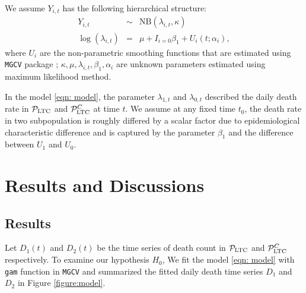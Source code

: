 \documentclass[12pt]{article}
\begin{document}
We assume $Y_{i,t}$ has the following hierarchical structure:
\begin{equation}
    \begin{array}{rcl} \label{eqn: model}
        Y_{i,t} &\sim& \mathrm{NB}(\lambda_{i,t}, \kappa)
        \\
        \log(\lambda_{i,t}) &=& \mu + I_{i=0} \beta_1 + U_i(t;\alpha_i),        
    \end{array}
\end{equation}
where $U_i$ are the non-parametric smoothing functions that are estimated using \verb|MGCV| package \cite{wood2015package};
$\kappa, \mu, \lambda_{i,t}, \beta_1, \alpha_i$ are unknown parameters estimated using maximum likelihood method.

In the model \eqref{eqn: model}, the parameter $\lambda_{1,t}$ and $\lambda_{0,t}$ described the daily death rate in $\mathcal{P}_{\mathrm{LTC}}$ and $\mathcal P_{\mathrm{LTC}}^C$ at time $t$. 
We assume at any fixed time $t_0$, the death rate in two subpopulation is roughly differed by a scalar factor due to epidemiological characteristic difference and is captured by the parameter $\beta_1$ and the difference between $U_1$ and $U_0$.




\section{Results and Discussions \label{sec: results}} 
\subsection{Results}
Let $D_1(t)$ and $D_2(t)$ be the time series of death count in $\mathcal P_{\mathrm{LTC}}$ and $\mathcal P_{\mathrm{LTC}}^C$ respectively. To examine our hypothesis $H_0$, We fit the model \eqref{eqn: model} with \verb|gam| function in \verb|MGCV| \cite{wood2015package} and summarized the fitted daily death time series
$D_1$ and $D_2$ in Figure \ref{figure:model}.
\end{document}
